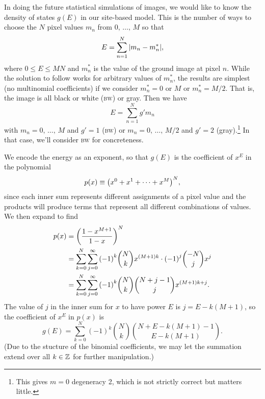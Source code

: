 \documentclass[../notebook.tex]{subfiles}
\begin{document}

In doing the future statistical simulations of images, we would like to know the
density of states $g(E)$ in our site-based model. This is the number of ways to
choose the $N$ pixel values $m_n$ from $0,\, \ldots,\, M$ so that
\[
  E
  = \sum_{n = 1}^N \abs{m_n - m_n^*},
\]
where $0 \le E \le MN$ and $m_n^*$ is the value of the ground image at pixel
$n$. While the solution to follow works for arbitrary values of $m_n^*$, the
results are simplest (no multinomial coefficients) if we consider $m_n^* = 0$ or
$M$ or $m_n^* = M/2$. That is, the image is all black or white (\textsc{bw}) or
gray. Then we have
\[
  E
  = \sum_{n = 1}^N g' m_n
\]
with $m_n = 0,\, \ldots,\, M$ and $g' = 1$ (\textsc{bw}) or $m_n = 0,\,
\ldots,\, M/2$ and $g' = 2$ (gray).\footnote{This gives $m = 0$ degeneracy 2,
which is not strictly correct but matters little.}
In that case, we'll consider \textsc{bw} for concreteness.

We encode the energy as an exponent, so that $g(E)$ is the coefficient of $x^E$
in the polynomial
\[
  p(x)
  \equiv {\qty(x^0 + x^1 + \cdots + x^M)}^N,
\]
since each inner sum represents different assignments of a pixel value and the
products will produce terms that represent all different combinations of values.
We then expand to find
\begin{align}
  p(x)
  &= {\qty(\frac{1 - x^{M+1}}{1 - x})}^N \\
  &= \sum_{k=0}^N \sum_{j=0}^\infty
  {(-1)}^k \binom{N}{k} x^{(M+1)k} \cdot {(-1)}^j \binom{-N}{j} x^j \\
  &= \sum_{k=0}^N \sum_{j=0}^\infty
  {(-1)}^k \binom{N}{k} \binom{N + j - 1}{j} x^{(M+1)k + j}.
\end{align}
The value of $j$ in the inner sum for $x$ to have power $E$ is $j = E - k(M+1)$,
so the coefficient of $x^E$ in $p(x)$ is
\begin{equation}
  \label{eq:imgdos}
  g(E)
  = \sum_{k=0}^N
  {(-1)}^k \binom{N}{k} \binom{N + E - k(M+1) - 1}{E - k(M+1)}.
\end{equation}
(Due to the stucture of the binomial coefficients, we may let the summation
extend over all $k \in \mathbb{Z}$ for further manipulation.)
\end{document}
